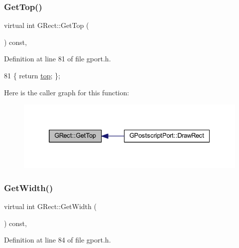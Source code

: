 \subsubsection{\texorpdfstring{Get\+Top()}{GetTop()}}
{\footnotesize\ttfamily virtual int G\+Rect\+::\+Get\+Top (\begin{DoxyParamCaption}{ }\end{DoxyParamCaption}) const\hspace{0.3cm}{\ttfamily [inline]}, {\ttfamily [virtual]}}



Definition at line 81 of file gport.\+h.


\begin{DoxyCode}
81 \{ \textcolor{keywordflow}{return} \mbox{\hyperlink{class_g_rect_af22c8a22a7d2fe0f139375e7eb171675}{top}}; \};
\end{DoxyCode}
Here is the caller graph for this function\+:\nopagebreak
\begin{figure}[H]
\begin{center}
\leavevmode
\includegraphics[width=332pt]{class_g_rect_ac346895770ff4c98c672485a05819f55_icgraph}
\end{center}
\end{figure}
\mbox{\label{class_g_rect_af36a407452070f2e93a25dbafd3b4314}} 
\subsubsection{\texorpdfstring{Get\+Width()}{GetWidth()}}
{\footnotesize\ttfamily virtual int G\+Rect\+::\+Get\+Width (\begin{DoxyParamCaption}{ }\end{DoxyParamCaption}) const\hspace{0.3cm}{\ttfamily [inline]}, {\ttfamily [virtual]}}



Definition at line 84 of file gport.\+h.


